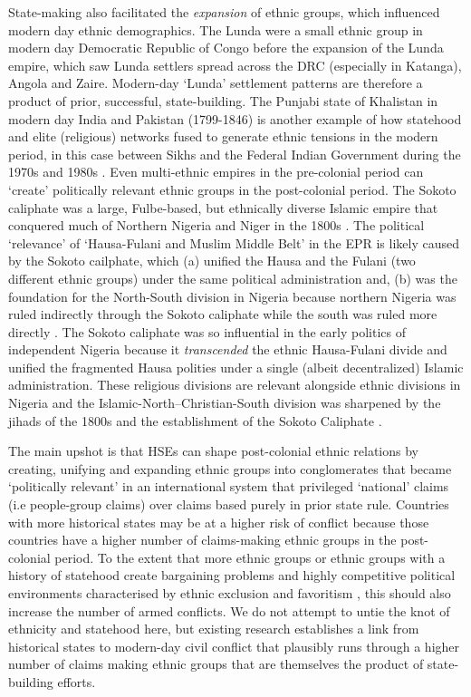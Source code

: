 State-making also facilitated the \emph{expansion} of ethnic groups, which
influenced modern day ethnic demographics. The Lunda were a small ethnic group
in modern day Democratic Republic of Congo before the expansion of the Lunda
empire, which saw Lunda settlers spread across the DRC (especially in Katanga),
Angola and Zaire. Modern-day `Lunda' settlement patterns are therefore a product
of prior, successful, state-building. The Punjabi state of Khalistan in modern
day India and Pakistan (1799-1846) is another example of how statehood and elite
(religious) networks fused to generate ethnic tensions in the modern period, in
this case between Sikhs and the Federal Indian Government during the 1970s and
1980s \citep{Grewal1998}. Even multi-ethnic empires in the pre-colonial period
can `create' politically relevant ethnic groups in the post-colonial period. The
Sokoto caliphate was a large, Fulbe-based, but ethnically diverse Islamic empire
that conquered much of Northern Nigeria and Niger in the 1800s \citep{Law1977}.
The political `relevance' of `Hausa-Fulani and Muslim Middle Belt' in the EPR is
likely caused by the Sokoto cailphate, which (a) unified the Hausa and the
Fulani (two different ethnic groups) under the same political administration
and, (b) was the foundation for the North-South division in Nigeria because
northern Nigeria was ruled indirectly through the Sokoto caliphate while the
south was ruled more directly \citep{Paine2019}. The Sokoto caliphate was so
influential in the early politics of independent Nigeria because it
\textit{transcended} the ethnic Hausa-Fulani divide and unified the fragmented
Hausa polities under a single (albeit decentralized) Islamic administration.
These religious divisions are relevant alongside ethnic divisions in Nigeria and
the Islamic-North--Christian-South division was sharpened by the jihads of the
1800s and the establishment of the Sokoto Caliphate \citep{Reynolds1997}. 

The main upshot is that HSEs can shape post-colonial ethnic relations by
creating, unifying and expanding ethnic groups into conglomerates that became
`politically relevant' in an international system that privileged `national'
claims (i.e people-group claims) over claims based purely in prior state rule.
Countries with more historical states may be at a higher risk of conflict
because those countries have a higher number of claims-making ethnic groups in
the post-colonial period. To the extent that more ethnic groups or ethnic groups
with a history of statehood create bargaining problems and highly competitive
political environments characterised by ethnic exclusion and favoritism
\citep{Paine2019, Roessler2016, Cederman2013}, this should also increase the
number of armed conflicts. We do not attempt to untie the knot of ethnicity and
statehood here, but existing research establishes a link from historical states
to modern-day civil conflict that plausibly runs through a higher number of claims
making ethnic groups that are themselves the product of state-building efforts.

